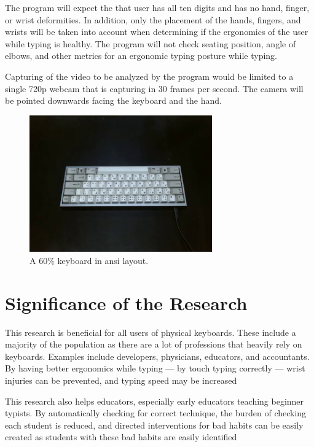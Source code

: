 \documentclass{report}
\begin{document}
The program will expect the that user has all ten digits and has no hand,
finger, or wrist deformities. In addition, only the placement of the hands,
fingers, and wrists will be taken into account when determining if the
ergonomics of the user while typing is healthy. The program will not check
seating position, angle of elbows, and other metrics for an ergonomic typing
posture while typing.

Capturing of the video to be analyzed by the program would be limited to a
single 720p webcam that is capturing in 30 frames per second. The camera will be
pointed downwards facing the keyboard and the hand.

\begin{figure}[H]
	\centering
	\includegraphics[width=0.7\textwidth]{60.png}
	\caption{A 60\% keyboard in \ac{ansi} layout.}
	\label{fig:60}
	\centering
\end{figure}


\section{Significance of the Research}
This research is beneficial for all users of physical keyboards. These include a
majority of the population as there are a lot of professions that heavily rely
on keyboards. Examples include developers, physicians, educators, and
accountants. By having better ergonomics while typing --- by touch typing
correctly --- wrist injuries can be prevented, and typing speed may be increased

This research also helps educators, especially early educators teaching beginner
typists. By automatically checking for correct technique, the burden of checking
each student is reduced, and directed interventions for bad habits can be
easily created as students with these bad habits are easily identified
\end{document}
